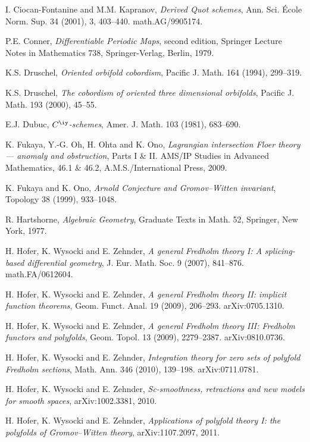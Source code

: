 \documentclass{article}
\begin{document}
\begin{thebibliography}{99}
 I. Ciocan-Fontanine and M.M. Kapranov, {\it Derived
Quot schemes}, Ann. Sci. \'Ecole Norm. Sup. 34 (2001), 3, 403--440.
math.AG/9905174.

 P.E. Conner, {\it Differentiable Periodic Maps},
second edition, Springer Lecture Notes in Mathematics 738,
Springer-Verlag, Berlin, 1979.

 K.S. Druschel, {\it Oriented orbifold cobordism},
Pacific J. Math. 164 (1994), 299--319.

 K.S. Druschel, {\it The cobordism of oriented three
dimensional orbifolds}, Pacific J. Math. 193 (2000), 45--55.

 E.J. Dubuc, {\it $C^\iy$-schemes}, Amer. J. Math. 103
(1981), 683--690.

 K. Fukaya, Y.-G. Oh, H. Ohta and K. Ono,
{\it Lagrangian intersection Floer theory --- anomaly and
obstruction}, Parts I \& II. AMS/IP Studies in Advanced Mathematics,
46.1 \& 46.2, A.M.S./International Press, 2009.

 K. Fukaya and K. Ono, {\it Arnold Conjecture and
Gromov--Witten invariant}, Topology 38 (1999), 933--1048.

 R. Hartshorne, {\it Algebraic Geometry}, Graduate
Texts in Math. 52, Springer, New York, 1977.

 H. Hofer, K. Wysocki and E. Zehnder, {\it A general
Fredholm theory I: A splicing-based differential geometry}, J. Eur.
Math. Soc. 9 (2007), 841--876. math.FA/0612604.

 H. Hofer, K. Wysocki and E. Zehnder, {\it A general
Fredholm theory II: implicit function theorems}, Geom. Funct. Anal.
19 (2009), 206--293. arXiv:0705.1310.

 H. Hofer, K. Wysocki and E. Zehnder, {\it A general
Fredholm theory III: Fredholm functors and polyfolds}, Geom. Topol.
13 (2009), 2279--2387. arXiv:0810.0736.

 H. Hofer, K. Wysocki and E. Zehnder, {\it
Integration theory for zero sets of polyfold Fredholm sections},
Math. Ann. 346 (2010), 139--198. \hfil\break arXiv:0711.0781.

 H. Hofer, K. Wysocki and E. Zehnder, {\it
Sc-smoothness, retractions and new models for smooth spaces},
arXiv:1002.3381, 2010.

 H. Hofer, K. Wysocki and E. Zehnder, {\it
Applications of polyfold theory I: the polyfolds of Gromov--Witten
theory}, arXiv:1107.2097, 2011.


\end{thebibliography}
\end{document}
